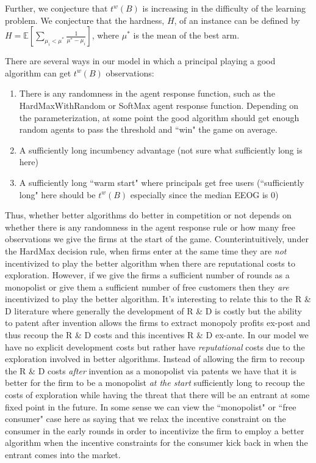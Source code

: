\documentclass[11pt,letterpaper]{article}
\begin{document}
Further, we conjecture that $t^{w}(B)$ is increasing in the difficulty of the learning problem. We conjecture that the hardness, $H$, of an instance can be defined by \\ $H = \mathbb{E}[\sum\limits_{\mu_{i} < \mu^{*}} \frac{1}{\mu^{*} - \mu_{i}}]$, where $\mu^{*}$ is the mean of the best arm.

There are several ways in our model in which a principal playing a good algorithm can get $t^{w}(B)$ observations:
\begin{enumerate}
\item There is any randomness in the agent response function, such as the HardMaxWithRandom or SoftMax agent response function. Depending on the parameterization, at some point the good algorithm should get enough random agents to pass the threshold and ``win" the game on average.
\item A sufficiently long incumbency advantage (not sure what sufficiently long is here)
\item A sufficiently long ``warm start" where principals get free users (``sufficiently long" here should be $t^{w}(B)$ especially since the median EEOG is $0$)
\end{enumerate}

Thus, whether better algorithms do better in competition or not depends on whether there is any randomness in the agent response rule or how many free observations we give the firms at the start of the game. Counterintuitively, under the HardMax decision rule, when firms enter at the same time they are \textit{not} incentivized to play the better algorithm when there are reputational costs to exploration. However, if we give the firms a sufficient number of rounds as a monopolist or give them a sufficient number of free customers then they \textit{are} incentivized to play the better algorithm. It's interesting to relate this to the R \& D literature where generally the development of R \& D is costly but the ability to patent after invention allows the firms to extract monopoly profits ex-post and thus recoup the R \& D costs and this incentives R \& D ex-ante. In our model we have no explicit development costs but rather have \textit{reputational} costs due to the exploration involved in better algorithms. Instead of allowing the firm to recoup the R \& D costs \textit{after} invention as a monopolist via patents we have that it is better for the firm to be a monopolist \textit{at the start} sufficiently long to recoup the costs of exploration while having the threat that there will be an entrant at some fixed point in the future. In some sense we can view the ``monopolist" or ``free consumer" case here as saying that we relax the incentive constraint on the consumer in the early rounds in order to incentivize the firm to employ a better algorithm when the incentive constraints for the consumer kick back in when the entrant comes into the market.
\end{document}
